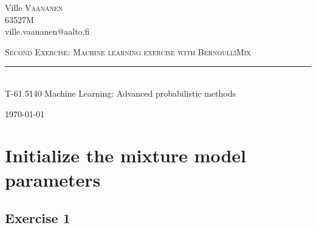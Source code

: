 \documentclass[a4paper,oneside,article]{memoir}
\author{Ville Väänänen}
\newcommand{\HRule}{\rule{\linewidth}{0.5mm}}
\newcommand{\course}{T-61.5140}
\newcommand{\coursename}{Machine Learning: Advanced probabilistic methods}
\newcommand{\studentid}{63527M}
\renewcommand{\title}{Second Exercise: Machine learning exercise with BernoulliMix}
\begin{document}
\begin{titlingpage}
	\begin{adjustwidth}{-0.6in}{-0.6in}
	\begin{center}
			\begin{flushright} \large
			Ville \textsc{Väänänen}\\
			\studentid\\
			ville.vaananen@aalto.fi
			\end{flushright}
		\vspace{8.0cm}
		
		\textsc{\LARGE \title}
		\HRule \\[0.19cm]
		{\large \course\: \coursename}
		
		\vfill
		\today
	\end{center}
	\end{adjustwidth}
\end{titlingpage}
\newpage


\section{Initialize the mixture model parameters}

\subsection*{Exercise 1}
\end{document}
